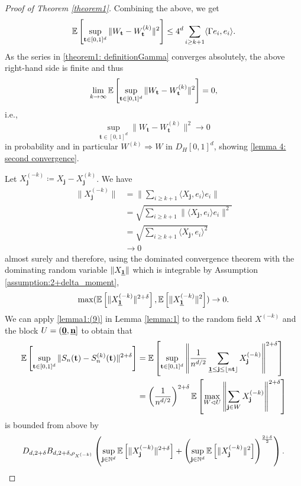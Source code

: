 \begin{proof}[Proof of Theorem \ref{theorem1}]
    Combining the above, we get
    \[ \mathbb{E}\left[\sup\limits_{\mathbf{t} \in [0,1]^d} \| W_\mathbf{t}-W^{(k)}_\mathbf{t}\|^2\right] \leq 4^d \sum\limits_{i \geq k+1} \langle \Gamma e_i, e_i \rangle. \]
    As the series in \eqref{theorem1: definitionGamma} converges absolutely, the above right-hand side is finite and thus
    \[ \lim\limits_{k \to \infty} \mathbb{E}\left[\sup\limits_{\mathbf{t} \in [0,1]^d} \| W_\mathbf{t}-W^{(k)}_\mathbf{t}\|^2\right] = 0, \]
    i.e.,
    \[ \sup\limits_{\mathbf{t} \in [0,1]^d} \| W_\mathbf{t}-W^{(k)}_\mathbf{t}\|^2 \to 0 \]
    in probability and in particular $W^{(k)} \Rightarrow W$ in $D_H[0,1]^d$, showing \eqref{lemma 4: second convergence}.

    Let $X^{(-k)}_\mathbf{j} \coloneqq X_\mathbf{j} - X^{(k)}_\mathbf{j}$. We have 
    \begin{align*}  
        \|X^{(-k)}_\mathbf{j}\|
        & = \| \sum\limits_{i \geq k+1} \langle X_\mathbf{j}, e_i \rangle e_i  \| \\
        & = \sqrt{\sum\limits_{i \geq k+1} \| \langle X_\mathbf{j}, e_i \rangle e_i \|^2} \\
        & = \sqrt{\sum\limits_{i \geq k+1} \langle X_\mathbf{j}, e_i \rangle^2} \\
        & \to 0 
    \end{align*}
    almost surely and therefore, using the dominated convergence theorem with the dominating random variable $\| X_{\usbf[1]} \|$ which is integrable by Assumption \ref{assumption:2+delta_moment},
    \begin{equation} \label{proof thm 1: convergence max -k X to 0} 
        \max(\EE{\| X^{(-k)}_{\usbf[1]} \|^{2+\delta}}, \EE{\| X^{(-k)}_{\usbf[1]} \|^2}) \to 0. 
    \end{equation}
    We can apply \eqref{lemma1:(9)} in Lemma \ref{lemma:1} to the random field $X^{(-k)}$ and the block $U = (\usbf[0], \usbf[n]]$ to obtain that
    \begin{align*}
        \EE{\sup\limits_{\mathbf{t} \in [0,1]^d} \| S_n(\mathbf{t})-S^{(k)}_n(\mathbf{t})\|^{2+\delta}}
        & = \EE{\sup\limits_{\mathbf{t} \in [0,1]^d} \left\| \frac{1}{n^{d/2}} \sum\limits_{\usbf[1] \leq \mathbf{j} \leq \floor*{n \mathbf{t}}} X_\mathbf{j}^{(-k)} \right\|^{2+\delta}} \\
        & = \left(\frac{1}{n^{d/2}}\right)^{2+\delta} \EE{\max\limits_{W \lhd U} \left\| \sum\limits_{\mathbf{j} \in W} X_\mathbf{j}^{(-k)} \right\|^{2+\delta}}
    \end{align*}
    is bounded from above by
    \[ D_{d, 2+\delta} B_{d, 2+\delta, \rho_{X^{(-k)}}} \left( \sup\limits_{\mathbf{j} \in \mathbb{N}^d} \mathbb{E}\left[\| X^{(-k)}_\mathbf{j}\|^{2+\delta}\right] + \left( \sup\limits_{\mathbf{j} \in \mathbb{N}^d} \mathbb{E}\left[\|X^{(-k)}_\mathbf{j}\|^2\right] \right)^\frac{2+\delta}{2} \right). \]

\end{proof}
